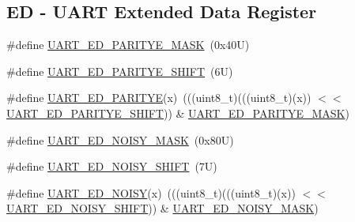 \subsection*{ED -\/ U\+A\+RT Extended Data Register}
\begin{DoxyCompactItemize}
\item 
\#define \mbox{\hyperlink{group___u_a_r_t___register___masks_gad2d9046649263c73bfa0e64091c82d45}{U\+A\+R\+T\+\_\+\+E\+D\+\_\+\+P\+A\+R\+I\+T\+Y\+E\+\_\+\+M\+A\+SK}}~(0x40\+U)
\item 
\#define \mbox{\hyperlink{group___u_a_r_t___register___masks_gaed5785f9e519dfa7936d82f4fedb8a83}{U\+A\+R\+T\+\_\+\+E\+D\+\_\+\+P\+A\+R\+I\+T\+Y\+E\+\_\+\+S\+H\+I\+FT}}~(6\+U)
\item 
\#define \mbox{\hyperlink{group___u_a_r_t___register___masks_ga53731287ee7b9ebb2313101c8115c293}{U\+A\+R\+T\+\_\+\+E\+D\+\_\+\+P\+A\+R\+I\+T\+YE}}(x)~(((uint8\+\_\+t)(((uint8\+\_\+t)(x)) $<$$<$ \mbox{\hyperlink{group___u_a_r_t___register___masks_gaed5785f9e519dfa7936d82f4fedb8a83}{U\+A\+R\+T\+\_\+\+E\+D\+\_\+\+P\+A\+R\+I\+T\+Y\+E\+\_\+\+S\+H\+I\+FT}})) \& \mbox{\hyperlink{group___u_a_r_t___register___masks_gad2d9046649263c73bfa0e64091c82d45}{U\+A\+R\+T\+\_\+\+E\+D\+\_\+\+P\+A\+R\+I\+T\+Y\+E\+\_\+\+M\+A\+SK}})
\item 
\#define \mbox{\hyperlink{group___u_a_r_t___register___masks_gab5ab58923c23cde1672fc9ae19053696}{U\+A\+R\+T\+\_\+\+E\+D\+\_\+\+N\+O\+I\+S\+Y\+\_\+\+M\+A\+SK}}~(0x80\+U)
\item 
\#define \mbox{\hyperlink{group___u_a_r_t___register___masks_gab366fc1267a46213bc540e93c2603a6c}{U\+A\+R\+T\+\_\+\+E\+D\+\_\+\+N\+O\+I\+S\+Y\+\_\+\+S\+H\+I\+FT}}~(7\+U)
\item 
\#define \mbox{\hyperlink{group___u_a_r_t___register___masks_ga679117a3349699feddda25a5349d7426}{U\+A\+R\+T\+\_\+\+E\+D\+\_\+\+N\+O\+I\+SY}}(x)~(((uint8\+\_\+t)(((uint8\+\_\+t)(x)) $<$$<$ \mbox{\hyperlink{group___u_a_r_t___register___masks_gab366fc1267a46213bc540e93c2603a6c}{U\+A\+R\+T\+\_\+\+E\+D\+\_\+\+N\+O\+I\+S\+Y\+\_\+\+S\+H\+I\+FT}})) \& \mbox{\hyperlink{group___u_a_r_t___register___masks_gab5ab58923c23cde1672fc9ae19053696}{U\+A\+R\+T\+\_\+\+E\+D\+\_\+\+N\+O\+I\+S\+Y\+\_\+\+M\+A\+SK}})
\end{DoxyCompactItemize}
